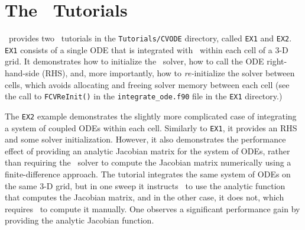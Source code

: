 \section{The \cvode\ Tutorials}

\amrex\ provides two \cvode\ tutorials in the \texttt{Tutorials/CVODE} directory, called \texttt{EX1} and \texttt{EX2}.
\texttt{EX1} consists of a single ODE that is integrated with \cvode\ within each cell of a 3-D grid.
It demonstrates how to initialize the \cvode\ solver, how to call the ODE right-hand-side (RHS), and, more importantly, how to \emph{re-}initialize the solver between cells, which avoids allocating and freeing solver memory between each cell (see the call to \texttt{FCVReInit()} in the \texttt{integrate\_ode.f90} file in the \texttt{EX1} directory.)

The \texttt{EX2} example demonstrates the slightly more complicated case of integrating a system of coupled ODEs within each cell.
Similarly to \texttt{EX1}, it provides an RHS and some solver initialization.
However, it also demonstrates the performance effect of providing an analytic Jacobian matrix for the system of ODEs, 
rather than requiring the \cvode\ solver to compute the Jacobian matrix numerically using a finite-difference approach.
The tutorial integrates the same system of ODEs on the same 3-D grid, but in one sweep it instructs \cvode\ 
to use the analytic function that computes the Jacobian matrix, and in the other case, it does not,
which requires \cvode\ to compute it manually.
One observes a significant performance gain by providing the analytic Jacobian function.
